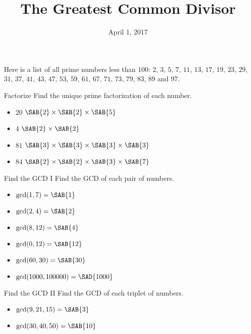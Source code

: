 \documentclass[12pt,letterpaper]{article}
\title{The Greatest Common Divisor}
\date{April 1, 2017}
\begin{document}
\maketitle

\thispagestyle{empty}

Here is a list of all prime numbers less than $100$: $2$, $3$, $5$, $7$, $11$,
$13$, $17$, $19$, $23$, $29$, $31$, $37$, $41$, $43$, $47$, $53$, $59$, $61$,
$67$, $71$, $73$, $79$, $83$, $89$ and $97$.

\begin{problem}{Factorize}
 Find the unique prime factorization of each number.

 \begin{itemize}
  \item $20$ \hfill $\SAB{2} \times \SAB{2} \times \SAB{5}$
  \item $4$ \hfill $\SAB{2} \times \SAB{2}$
  \item $81$ \hfill $\SAB{3} \times \SAB{3} \times \SAB{3} \times \SAB{3}$
  \item $84$ \hfill $\SAB{2} \times \SAB{2} \times \SAB{3} \times \SAB{7}$
 \end{itemize}
\end{problem}

\begin{problem}{Find the GCD I}
 Find the GCD of each pair of numbers.

 \begin{itemize}
  \item $\gcd(1, 7) = \SAB{1}$
  \item $\gcd(2, 4) = \SAB{2}$
  \item $\gcd(8, 12) = \SAB{4}$
  \item $\gcd(0, 12) = \SAB{12}$
  \item $\gcd(60, 30) = \SAB{30}$
  \item $\gcd(1000, 100000) = \SAD{1000}$
 \end{itemize}
\end{problem}

\begin{problem}{Find the GCD II}
 Find the GCD of each triplet of numbers.

 \begin{itemize}
  \item $\gcd(9, 21, 15) = \SAB{3}$
  \item $\gcd(30, 40, 50) = \SAB{10}$
 \end{itemize}
\end{problem}
\end{document}
